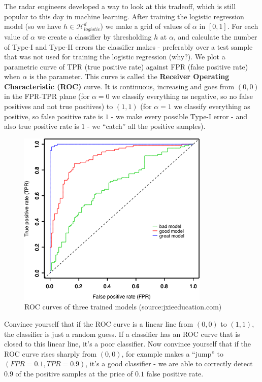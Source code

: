 \documentclass[11pt]{article}
\newcommand{\Hc}{\mathcal{H}}
\begin{document}
	The radar engineers developed a way to look at this tradeoff, which is
	still popular to this day in machine learning. After training the
	logistic regression model (so we have $h\in\Hc_{logistic}^d$)  we make a grid of values of $\alpha$ in
	$[0,1]$. For each value of $\alpha$ we create a classifier by thresholding  $h$ at
	$\alpha$, and calculate the number of  Type-I and Type-II errors the
	classifier makes - preferably over a test sample that was not used for
	training the logistic regression (why?).  We plot a parametric curve of TPR (true
	positive rate) against FPR (false positive rate) when $\alpha$ is the
	parameter. This curve is called the {\bf Receiver Operating
	Characteristic (ROC)} curve. It is continuous, increasing and goes from
	$(0,0)$ in the FPR-TPR plane 
	(for $\alpha=0$ we classify everything as negative, so no false
	positives and not true positives) to $(1,1)$ (for $\alpha=1$ we
	  classify everything as positive, so false positive rate is $1$ - we
	  make every possible Type-I error - and
	  also true positive rate is $1$ - we ``catch'' all the positive
	samples).

	\begin{figure}[h!]
	  \centering
	  \includegraphics{roc.png}
	  \caption{ROC curves of three trained models (source:jxieeducation.com)}
	\end{figure}

	Convince yourself that if the ROC curve is a linear line from $(0,0)$ to
	$(1,1)$, the classifier is just a random guess. If a classifier has an
	ROC curve that is closed to this linear line, it's a poor classifier.
	Now convince yourself that if the ROC curve rises sharply from $(0,0)$,
	for example makes a ``jump'' to $(FPR=0.1, TPR=0.9)$, it's a good
	classifier - we are able to correctly detect $0.9$ of the positive
	samples at the price of $0.1$ false positive rate. 
\end{document}
